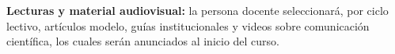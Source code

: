 \begin{refsection}




\nocite{Hig98}
\nocite{KLR89}
\nocite{Lam94}
\nocite{Kra17}
\nocite{CGS-RCR}
\nocite{AMS-authors}
\nocite{MAA-resources}

\printcursosbibliography

\textbf{Lecturas y material audiovisual:} la persona docente seleccionará, por ciclo lectivo, artículos modelo, guías institucionales y videos sobre comunicación científica, los cuales serán anunciados al inicio del curso.

\end{refsection}

